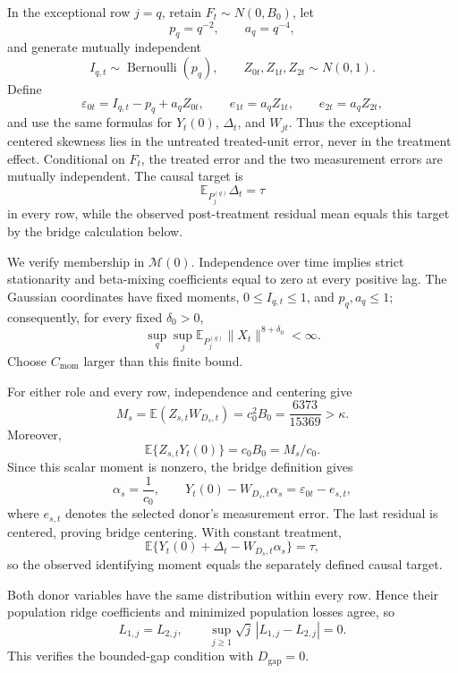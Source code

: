 In the exceptional row \(j=q\), retain \(F_t\sim N(0,B_0)\), let
\[
 p_q=q^{-2},\qquad a_q=q^{-4},
\]
and generate mutually independent
\[
 I_{q,t}\sim\operatorname{Bernoulli}(p_q),\qquad
 Z_{0t},Z_{1t},Z_{2t}\sim N(0,1).
\]
Define
\[
 \varepsilon_{0t}=I_{q,t}-p_q+a_qZ_{0t},\qquad
 e_{1t}=a_qZ_{1t},\qquad e_{2t}=a_qZ_{2t},
\]
and use the same formulas for \(Y_t(0)\), \(\Delta_t\), and \(W_{jt}\).  Thus the exceptional centered skewness lies in the untreated treated-unit error, never in the treatment effect.  Conditional on \(F_t\), the treated error and the two measurement errors are mutually independent.  The causal target is
\[
 \mathbb E_{P_j^{(q)}}\Delta_t=\tau
\]
in every row, while the observed post-treatment residual mean equals this target by the bridge calculation below.

We verify membership in \(\mathcal M(0)\).  Independence over time implies strict stationarity and beta-mixing coefficients equal to zero at every positive lag.  The Gaussian coordinates have fixed moments, \(0\leq I_{q,t}\leq1\), and \(p_q,a_q\leq1\); consequently, for every fixed \(\delta_0>0\),
\[
 \sup_q\sup_j
 \mathbb E_{P_j^{(q)}}\|X_t\|^{8+\delta_0}<\infty.
\]
Choose \(C_{\mathrm{mom}}\) larger than this finite bound.

For either role and every row, independence and centering give
\[
 M_s=\mathbb E(Z_{s,t}W_{D_s,t})=c_0^2B_0
     =\frac{6373}{15369}>\kappa.
\]
Moreover,
\[
 \mathbb E\{Z_{s,t}Y_t(0)\}=c_0B_0=M_s/c_0.
\]
Since this scalar moment is nonzero, the bridge definition gives
\[
 \alpha_s=\frac1{c_0},
\qquad
 Y_t(0)-W_{D_s,t}\alpha_s=\varepsilon_{0t}-e_{s,t},
\]
where \(e_{s,t}\) denotes the selected donor's measurement error.  The last residual is centered, proving bridge centering.  With constant treatment,
\[
 \mathbb E\{Y_t(0)+\Delta_t-W_{D_s,t}\alpha_s\}
 =\tau,
\]
so the observed identifying moment equals the separately defined causal target.

Both donor variables have the same distribution within every row.  Hence their population ridge coefficients and minimized population losses agree, so
\[
 L_{1,j}=L_{2,j},\qquad
 \sup_{j\geq1}\sqrt j\,|L_{1,j}-L_{2,j}|=0.
\]
This verifies the bounded-gap condition with \(D_{\mathrm{gap}}=0\).

